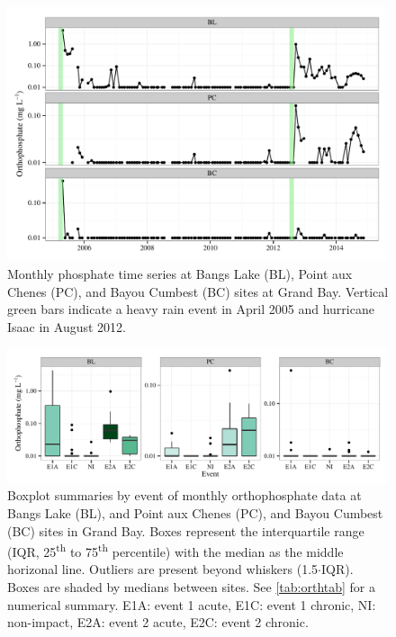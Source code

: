 \documentclass[letterpaper,12pt]{article}\usepackage[]{graphicx}\usepackage[]{color}
\makeatletter
\def\maxwidth{ %
  \ifdim\Gin@nat@width>\linewidth
    \linewidth
  \else
    \Gin@nat@width
  \fi
}
\makeatother
\begin{document}
\begin{figure}[!ht]

{\centering \includegraphics[width=\maxwidth]{figs/orthtsfig-1} 

}

\caption[Monthly phosphate time series at Bangs Lake (BL), Point aux Chenes (PC), and Bayou Cumbest (BC) sites at Grand Bay]{Monthly phosphate time series at Bangs Lake (BL), Point aux Chenes (PC), and Bayou Cumbest (BC) sites at Grand Bay. Vertical green bars indicate a heavy rain event in April 2005 and hurricane Isaac in August 2012.}\label{fig:orthtsfig}
\end{figure}


\clearpage

\begin{figure}[!ht]

{\centering \includegraphics[width=\maxwidth]{figs/orthfig-1} 

}

\caption{Boxplot summaries by event of monthly orthophosphate data at Bangs Lake (BL), and Point aux Chenes (PC), and Bayou Cumbest (BC) sites in Grand Bay.  Boxes represent the interquartile range (IQR, 25\textsuperscript{th} to 75\textsuperscript{th} percentile) with the median as the middle horizonal line.  Outliers are present beyond whiskers (1.5$\cdot$IQR). Boxes are shaded by medians between sites.  See \cref{tab:orthtab} for a numerical summary. E1A: event 1 acute, E1C: event 1 chronic, NI: non-impact, E2A: event 2 acute, E2C: event 2 chronic.}\label{fig:orthfig}
\end{figure}
\end{document}
